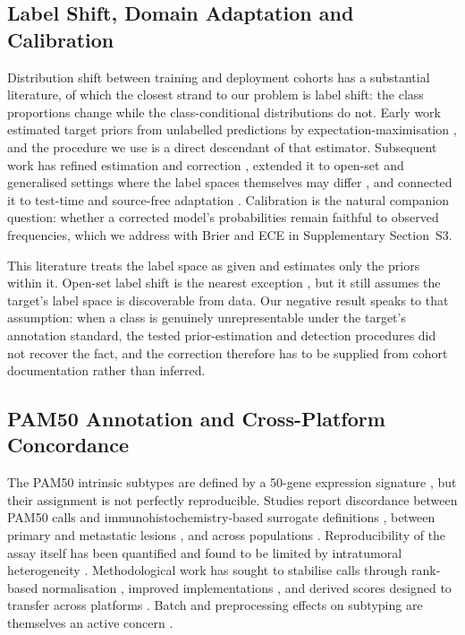 \documentclass[10pt,journal,compsoc,twocolumn]{IEEEtran}
\begin{document}
\subsection{Label Shift, Domain Adaptation and Calibration}
Distribution shift between training and deployment cohorts has a substantial literature, of which the closest strand to our problem is label shift: the class proportions change while the class-conditional distributions do not. Early work estimated target priors from unlabelled predictions by expectation-maximisation \cite{saerens2002adjusting}, and the procedure we use is a direct descendant of that estimator. Subsequent work has refined estimation and correction \cite{garg2022open,roberts2022unsupervised,liu2021scuda,stan2024unsupervised,mahapatra2024alfredo}, extended it to open-set and generalised settings where the label spaces themselves may differ \cite{popordanoska2024lascal,yang2025a1,yoshida2025classprior,volpi2025leap,gilet2023softmin,nakajima2022positiveunlabeled}, and connected it to test-time and source-free adaptation \cite{yang2022dltta,chen2025vpsfda,wang2022embracing,bandyopadhyay2021cryoshift,park2021transfer,lai2023domainaware}. Calibration is the natural companion question: whether a corrected model's probabilities remain faithful to observed frequencies, which we address with Brier and ECE in Supplementary Section~S3.

This literature treats the label space as given and estimates only the priors within it. Open-set label shift is the nearest exception \cite{popordanoska2024lascal,yang2025a1}, but it still assumes the target's label space is discoverable from data. Our negative result speaks to that assumption: when a class is genuinely unrepresentable under the target's annotation standard, the tested prior-estimation and detection procedures did not recover the fact, and the correction therefore has to be supplied from cohort documentation rather than inferred.

\subsection{PAM50 Annotation and Cross-Platform Concordance}
The PAM50 intrinsic subtypes are defined by a 50-gene expression signature \cite{parker2009supervised}, but their assignment is not perfectly reproducible. Studies report discordance between PAM50 calls and immunohistochemistry-based surrogate definitions \cite{phakathi2023pam50,lopeztarruella2023correlation,sayed2026immunohistochemistry}, between primary and metastatic lesions \cite{jrgensen2021pam}, and across populations \cite{desalegn2022intrinsic,hohmann2025molecular}. Reproducibility of the assay itself has been quantified and found to be limited by intratumoral heterogeneity \cite{hurson2023reproducibility,dixpeek2023discordance}. Methodological work has sought to stabilise calls through rank-based normalisation \cite{kandan2025rank}, improved implementations \cite{rajkumar2025enhanced}, and derived scores designed to transfer across platforms \cite{denegreirosbotan2026corepam}. Batch and preprocessing effects on subtyping are themselves an active concern \cite{wu2023on6,chen2022pathomic,rojasvelazquez2024methodology,van2024a,ng2023the,mann2021artificial,zhang2021machine}.
\end{document}
